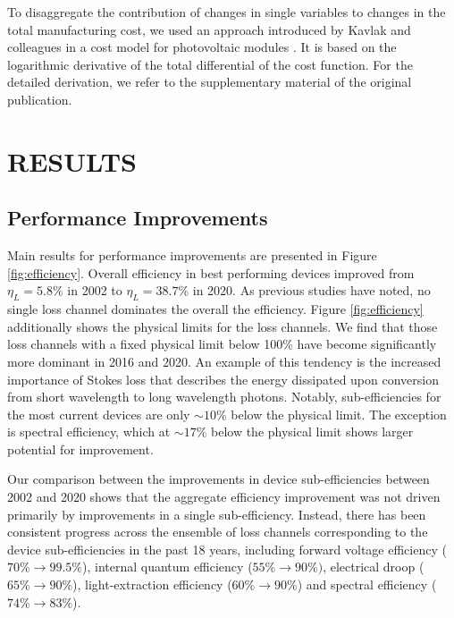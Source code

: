 \documentclass[a4paper,nocompress]{spie}  %
\begin{document}
        To disaggregate the contribution of changes in single variables to changes in the total manufacturing cost, we used an approach introduced by Kavlak and colleagues in a cost model for photovoltaic modules \cite{kavlak2018evaluating}. It is based on the logarithmic derivative of the total differential of the cost function. For the detailed derivation, we refer to the supplementary material of the original publication.

\section{RESULTS}

\subsection{Performance Improvements}

     Main results for performance improvements are presented in Figure \ref{fig:efficiency}. Overall efficiency in best performing devices improved from $\eta_L=5.8\%$ in 2002 to $\eta_L = 38.7\%$ in 2020. As previous studies have noted, no single loss channel dominates the overall the efficiency\cite{tsao2010solid}. Figure \ref{fig:efficiency} additionally shows the physical limits for the loss channels. We find that those loss channels with a fixed physical limit below 100\% have become significantly more dominant in 2016 and 2020. An example of this tendency is the increased importance of Stokes loss that describes the energy dissipated upon conversion from short wavelength to long wavelength photons. Notably, sub-efficiencies for the most current devices are only $\sim10\%$ below the physical limit. The exception is spectral efficiency, which at $\sim17\%$ below the physical limit shows larger potential for improvement.
     
     Our comparison between the improvements in device sub-efficiencies between 2002 and 2020 shows that the aggregate efficiency improvement was not driven primarily by improvements in a single sub-efficiency. Instead, there has been consistent progress across the ensemble of loss channels corresponding to the device sub-efficiencies in the past 18 years, including forward voltage efficiency ($70\%\rightarrow99.5\%$), internal quantum efficiency ($55\%\rightarrow90\%)$, electrical droop ($65\%\rightarrow90\%$), light-extraction efficiency ($60\%\rightarrow90\%$) and spectral efficiency ($74\% \rightarrow83\%$).
     
\end{document}
